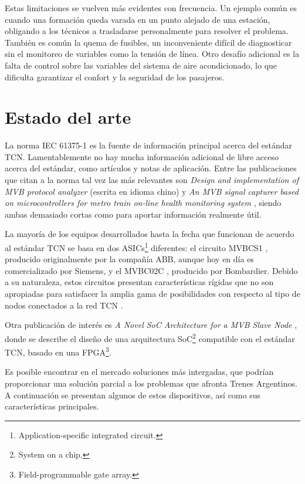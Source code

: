 Estas limitaciones se vuelven más evidentes con frecuencia. Un ejemplo común es cuando una formación queda varada en un punto alejado de una estación, obligando a los técnicos a trasladarse personalmente para resolver el problema.
También es común la quema de fusibles, un inconveniente difícil de diagnosticar sin el monitoreo de variables como la tensión de línea.
Otro desafío adicional es la falta de control sobre las variables del sistema de aire acondicionado, lo que dificulta garantizar el confort y la seguridad de los pasajeros.


\section{Estado del arte}

La norma IEC 61375-1 es la fuente de información principal acerca del estándar TCN. Lamentablemente no hay mucha información adicional de libre acceso acerca del estándar, como artículos y notas de aplicación. Entre las publicaciones que citan a la norma tal vez las más relevantes son \textit{Design and implementation of MVB protocol analyzer} \cite{mvb-pub-1} (escrita en idioma chino) y \textit{An MVB signal capturer based on microcontrollers for metro train on-line health monitoring system} \cite{mvb-pub-2}, siendo ambas demasiado cortas como para aportar información realmente útil.

La mayoría de los equipos desarrollados hasta la fecha que funcionan de acuerdo al estándar TCN se basa en dos ASICs\footnote{Application-specific integrated circuit.} diferentes: el circuito MVBCS1 \cite{mvbcs1}, producido originalmente por la compañía ABB, aunque hoy en día es comercializado por Siemens, y el MVBC02C \cite{mvbc02c}, producido por Bombardier. Debido a su naturaleza, estos circuitos presentan características rígidas que no son apropiadas para satisfacer la amplia gama de posibilidades con respecto al tipo de nodos conectados a la red TCN \cite{mvb-pub-3}.

Otra publicación de interés es \textit{A Novel SoC Architecture for a MVB Slave Node} \cite{mvb-pub-3}, donde se describe el diseño de una arquitectura SoC\footnote{System on a chip.} compatible con el estándar TCN, basado en una FPGA\footnote{Field-programmable gate array.}.

Es posible encontrar en el mercado soluciones más intergadas, que podrían proporcionar una solución parcial a los problemas que afronta Trenes Argentinos. A continuación se presentan algunos de estos dispositivos, así como sus características principales.

